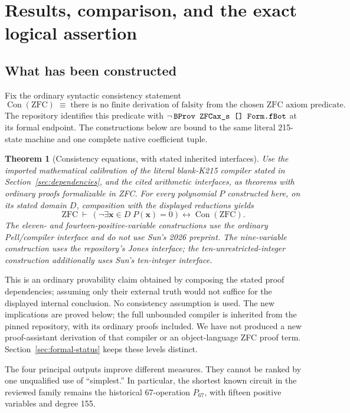 \documentclass[11pt,a4paper]{article}
\newcommand{\Con}{\operatorname{Con}}
\newtheorem{theorem}{Theorem}[section]
\theoremstyle{definition}
\theoremstyle{remark}
\numberwithin{equation}{section}
\begin{document}
\section{Results, comparison, and the exact logical assertion}

\subsection{What has been constructed}

Fix the ordinary syntactic consistency statement
\[
 \Con(\mathrm{ZFC})\;\equiv\;
 \text{there is no finite derivation of falsity from the chosen ZFC axiom predicate}.
\]
The repository identifies this predicate with
$\neg\,\texttt{\detokenize{BProv ZFCax_s [] Form.fBot}}$ at its formal
endpoint. The constructions below are bound to the same literal
215-state machine and one complete native coefficient tuple.

\begin{theorem}[Consistency equations, with stated inherited interfaces]
\label{thm:main}
Use the imported mathematical calibration of the literal blank-K215
compiler stated in Section~\ref{sec:dependencies}, and the cited arithmetic
interfaces, as theorems with ordinary proofs formalizable in ZFC.
For every polynomial $P$ constructed here, on its stated domain $D$,
composition with the displayed reductions yields
\[
 \mathrm{ZFC}\ \vdash\
 \left(\neg\exists\boldsymbol{x}\in D\;P(\boldsymbol{x})=0\right)
 \longleftrightarrow\Con(\mathrm{ZFC}).
\]
The eleven- and fourteen-positive-variable constructions use the
ordinary Pell/compiler interface and do not use Sun's 2026 preprint.
The nine-variable construction uses the repository's Jones interface;
the ten-unrestricted-integer construction additionally uses Sun's
ten-integer interface.
\end{theorem}

This is an ordinary provability claim obtained by composing the stated
proof dependencies; assuming only their external truth would not suffice
for the displayed internal conclusion. No consistency assumption is used.
The new implications are proved below; the full unbounded compiler is
inherited from the pinned repository, with its ordinary proofs included.
We have not produced a new proof-assistant derivation of that compiler
or an object-language ZFC proof term. Section~\ref{sec:formal-status}
keeps these levels distinct.

The four principal outputs improve different measures. They cannot be
ranked by one unqualified use of ``simplest.'' In particular, the shortest
known circuit in the reviewed family remains the historical
67-operation $P_{67}$, with fifteen positive variables and degree 155.
\end{document}
